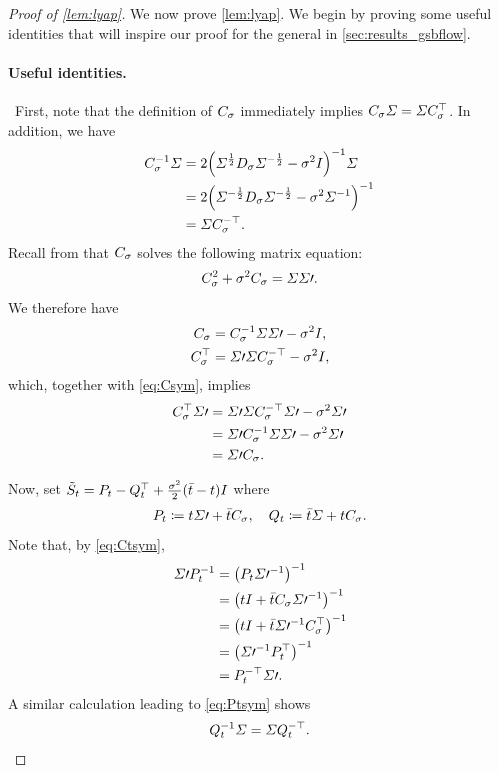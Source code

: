 \begin{proof}[Proof of \cref{lem:lyap}] 
We now prove \cref{lem:lyap}. We begin by proving some useful identities that will inspire our proof for the general  in \cref{sec:results_gsbflow}.

\paragraph{Useful identities.}
~First, note that the definition of $C_{\sigma}$ immediately implies $C_{\sigma} \Sigma = \Sigma C_{\sigma}^\top$. In addition, we have
\begin{align}
\nn
\C^{-1} \Sigma &= 2\parens*{ \Sigma^{\frac{1}{2}} \D  \Sigma^{-\frac{1}{2}} - \sdev^2\eye }^{-1} \Sigma \\
\nn
&= 2 \parens*{ \Sigma^{-\frac{1}{2}} \D  \Sigma^{-\frac{1}{2}} - \sdev^2\Sigma^{-1} }^{-1} \\
\label{eq:Csym}
&= \Sigma \C^{-\top}.
\end{align}
Recall from \citep{janati2020entropic} that $C_{\sigma}$ solves the following matrix equation:
\begin{align}
\label{eq:C}
\C^2 + \sdev^2\C =  \Sigma\Sigma\prime.
\end{align}
We therefore have
\begin{align*}
C_{\sigma} &= C_{\sigma}^{-1} \Sigma\Sigma\prime - \sigma^2I, \\
C_{\sigma}^\top &= \Sigma\prime\Sigma C_{\sigma}^{-\top} - \sigma^2I,
\end{align*}which, together with \eqref{eq:Csym}, implies
\begin{align}
\nn
\C^\top \Sigma\prime &= \Sigma\prime\Sigma \C^{-\top}\Sigma\prime-\sdev^2\Sigma\prime  \\
\nn
&=\Sigma\prime \C^{-1}\Sigma \Sigma\prime-\sdev^2\Sigma\prime   \\
\label{eq:Ctsym}
&= \Sigma\prime \C.
\end{align}


Now, set $\tilde{S}_{t} = P_{t} - Q_{t}^\top + \frac{\sigma^2}{2}(\bar{t}-t)I$ where
\begin{align}
P_{t} \coloneqq t \Sigma\prime + \bar{t} C_{\sigma}, \quad Q_{t} \coloneqq \bar{t} \Sigma + t C_{\sigma}.
\end{align}
Note that, by \eqref{eq:Ctsym}, 
\begin{align}
\nn
\Sigma\prime\Pt^{-1}  &= \parens*{ \Pt\Sigma\prime^{-1} }^{-1} \\
\nn
&= \parens*{\ctime\eye + \ctimebar  \C \Sigma\prime^{-1} }^{-1} \\
\nn
&=  \parens*{\ctime\eye + \ctimebar \Sigma\prime^{-1} \C^\top  }^{-1} \\
\nn
&= \parens*{ \Sigma\prime^{-1} \Pt^\top  }^{-1} \\
\label{eq:Ptsym}
&= \Pt^{-\top}\Sigma\prime.
\end{align}A similar calculation leading to \eqref{eq:Ptsym} shows
\begin{align}
\label{eq:Qtsym}
\Qt^{-1} \Sigma = \Sigma\Qt^{-\top}.
\end{align}


\end{proof}
